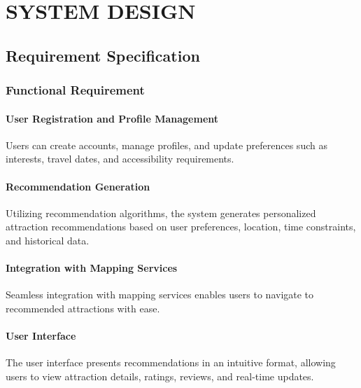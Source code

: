 \chapter{SYSTEM DESIGN}

\section{Requirement Specification}

\subsection{Functional Requirement}

\subsubsection{User Registration and Profile Management}
Users can create accounts, manage profiles, and update preferences such as interests, travel dates, and accessibility requirements.

\subsubsection{Recommendation Generation}
Utilizing recommendation algorithms, the system generates personalized attraction recommendations based on user preferences, location, time constraints, and historical data.


\subsubsection{Integration with Mapping Services}
Seamless integration with mapping services enables users to navigate to recommended attractions with ease.

\subsubsection{User Interface}
The user interface presents recommendations in an intuitive format, allowing users to view attraction details, ratings, reviews, and real-time updates.

